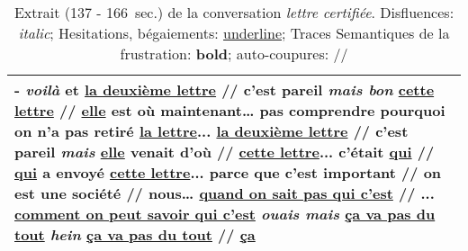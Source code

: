 \begin{table}[h]
    \centering
    \begin{tabular}{|p{}|}
      \hline
    - \textit{voilà} et \underline{la deuxième lettre}  // c'est pareil \textit{mais bon} \underline{cette lettre}  // \underline{elle} est où maintenant… pas comprendre pourquoi on n'a pas retiré \underline{la lettre}... \underline{la deuxième lettre}  // c'est pareil \textit{mais} \underline{elle} venait d'où  // \underline{cette lettre}... c’était \underline{qui}  // \underline{qui} a envoyé \underline{cette lettre}... parce que c'est important  // on est une société  // nous… \underline{quand on sait pas qui c'est} // ... \underline{comment on peut savoir qui c'est} \textit{ouais mais} \underline{\textbf{ça va pas du tout}} \textit{hein} \underline{\textbf{ça va pas du tout}}  // \underline{ça}
    \\ \hline
    \end{tabular}
    \caption{Extrait (137 - 166~sec.) de la conversation \textit{lettre certifiée}. Disfluences: \textit{italic}; Hesitations, bégaiements: \underline{underline}; Traces Semantiques de la frustration: \textbf{bold}; auto-coupures: //}
    \label{tab:ex_transcription}
\end{table}
